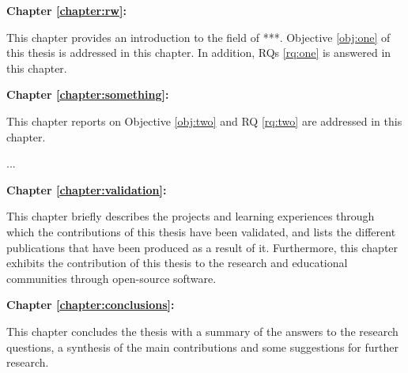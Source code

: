 \noindent \textbf{Chapter \ref{chapter:rw}: }

\vspace{-3mm}
\noindent This chapter provides an introduction to the field of ***. Objective \ref{obj:one} of this thesis is addressed in this chapter. In addition, \acp{RQ} \ref{rq:one} is answered in this chapter.
 
\noindent \textbf{Chapter \ref{chapter:something}: }

\vspace{-3mm}
\noindent  This chapter reports on  Objective \ref{obj:two} and  \ac{RQ} \ref{rq:two} are addressed in this chapter. 

...

\noindent \textbf{Chapter \ref{chapter:validation}: }

\vspace{-3.5mm}
\noindent This chapter briefly describes the projects and learning experiences through which the contributions of this thesis have been validated, and lists the different publications that have been produced as a result of it. Furthermore, this chapter exhibits the contribution of this thesis to the research and educational communities through open-source software.


\noindent \textbf{Chapter \ref{chapter:conclusions}: }

\vspace{-3.5mm}
\noindent This chapter concludes the thesis with a summary of the answers to the research questions, a synthesis of the main contributions and some suggestions for further research. \noclub